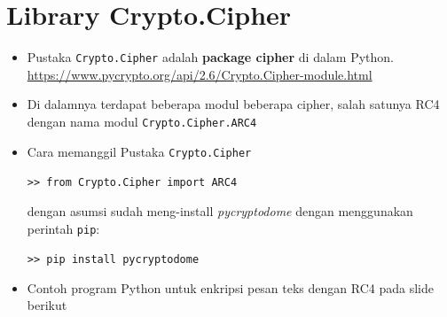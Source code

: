 \documentclass{article}
\begin{document}

\section*{Library Crypto.Cipher}

\begin{itemize}
    \item Pustaka \texttt{Crypto.Cipher} adalah \textbf{package cipher} di dalam Python.
    \url{https://www.pycrypto.org/api/2.6/Crypto.Cipher-module.html}
    \item Di dalamnya terdapat beberapa modul beberapa cipher, salah satunya RC4 dengan nama modul \texttt{Crypto.Cipher.ARC4}
    \item Cara memanggil Pustaka \texttt{Crypto.Cipher}
    \begin{center}
        \texttt{>> from Crypto.Cipher import ARC4}
    \end{center}
    dengan asumsi sudah meng-install \textit{pycryptodome} dengan menggunakan perintah \texttt{pip}:
    \begin{center}
        \texttt{>> pip install pycryptodome}
    \end{center}
    \item Contoh program Python untuk enkripsi pesan teks dengan RC4 pada slide berikut
\end{itemize}
\end{document}
